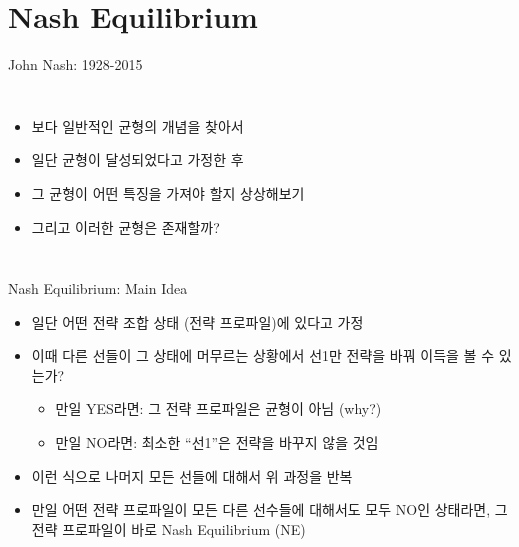 \documentclass[final]{beamer}
\begin{document}

\section{Nash Equilibrium} %
\label{sec:nash_equilibrium}

\begin{frame}[t]{John Nash: 1928-2015}
	\begin{columns}[c]
	\column{18em}
	\begin{itemize}
		\item 보다 일반적인 균형의 개념을 찾아서 
		\item 일단 균형이 달성되었다고 가정한 후 
		\item 그 균형이 어떤 특징을 가져야 할지 상상해보기 
		\item 그리고 이러한 균형은 존재할까? 
	\end{itemize}
	\column{12em}
	\end{columns}
\end{frame}

\begin{frame}[t]{Nash Equilibrium: Main Idea}
	\begin{itemize}
		\item 일단 어떤 전략 조합 상태 (전략 프로파일)에 있다고 가정
		\item 이때 다른 선들이 그 상태에 머무르는 상황에서 선1만 전략을 바꿔 이득을 볼 수 있는가? 
		\begin{itemize}
			\item 만일 YES라면: 그 전략 프로파일은 균형이 아님 (why?)
			\item 만일 NO라면: 최소한 ``선1''은 전략을 바꾸지 않을 것임
		\end{itemize}
		\item 이런 식으로 나머지 모든 선들에 대해서 위 과정을 반복
		\item 만일 어떤 전략 프로파일이 모든 다른 선수들에 대해서도 모두 NO인 상태라면, 그 전략 프로파일이 바로 Nash Equilibrium (NE)
	\end{itemize}
\end{frame}
\end{document}
